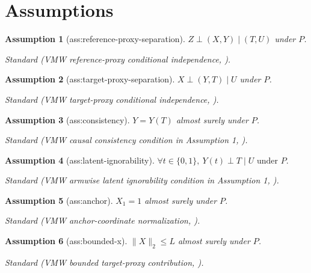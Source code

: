 \documentclass{article}
\newtheorem{assumption}{Assumption}
\begin{document}
\section{Assumptions}

\begin{assumption}[ass:reference-proxy-separation]\label{ass:reference-proxy-separation}
\(Z\perp (X,Y)\mid(T,U)\) under \(P\).
\par\smallskip\noindent\emph{Standard} (VMW reference-proxy conditional independence, \cite{VirkMazaheriWu2026}).
\end{assumption}

\begin{assumption}[ass:target-proxy-separation]\label{ass:target-proxy-separation}
\(X\perp (Y,T)\mid U\) under \(P\).
\par\smallskip\noindent\emph{Standard} (VMW target-proxy conditional independence, \cite{VirkMazaheriWu2026}).
\end{assumption}

\begin{assumption}[ass:consistency]\label{ass:consistency}
\(Y=Y(T)\) almost surely under \(P\).
\par\smallskip\noindent\emph{Standard} (VMW causal consistency condition in Assumption 1, \cite{VirkMazaheriWu2026}).
\end{assumption}

\begin{assumption}[ass:latent-ignorability]\label{ass:latent-ignorability}
\(\forall t\in\{0,1\},\ Y(t)\perp T\mid U\text{ under }P.\)
\par\smallskip\noindent\emph{Standard} (VMW armwise latent ignorability condition in Assumption 1, \cite{VirkMazaheriWu2026}).
\end{assumption}

\begin{assumption}[ass:anchor]\label{ass:anchor}
\(X_1=1\) almost surely under \(P\).
\par\smallskip\noindent\emph{Standard} (VMW anchor-coordinate normalization, \cite{VirkMazaheriWu2026}).
\end{assumption}

\begin{assumption}[ass:bounded-x]\label{ass:bounded-x}
\(\lVert X\rVert_2\le L\) almost surely under \(P\).
\par\smallskip\noindent\emph{Standard} (VMW bounded target-proxy contribution, \cite{VirkMazaheriWu2026}).
\end{assumption}
\end{document}
